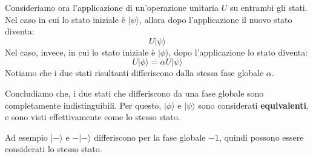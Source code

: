 Consideriamo ora l'applicazione di un'operazione unitaria $U$ su entrambi gli stati. Nel caso
in cui lo stato iniziale è $|\psi\rangle$, allora dopo l'applicazione il nuovo stato diventa:
\begin{equation*}
    U|\psi\rangle
\end{equation*}
Nel caso, invece, in cui lo stato iniziale è $|\phi\rangle$, dopo l'applicazione lo stato diventa:
\begin{equation*}
    U|\phi\rangle = \alpha U|\psi\rangle
\end{equation*}
Notiamo che i due stati risultanti differiscono dalla stessa fase globale $\alpha$.

Concludiamo che, i due stati che differiscono da una fase globale sono completamente indistinguibili.
Per questo, $|\phi\rangle$ e $|\psi\rangle$ sono considerati \textbf{equivalenti}, e sono visti effettivamente
come lo stesso stato.
\begin{example}{}{}
    Ad esempio $|-\rangle$ e $-|-\rangle$ differiscono per la fase globale $-1$, quindi possono
    essere considerati lo stesso stato.
\end{example}

